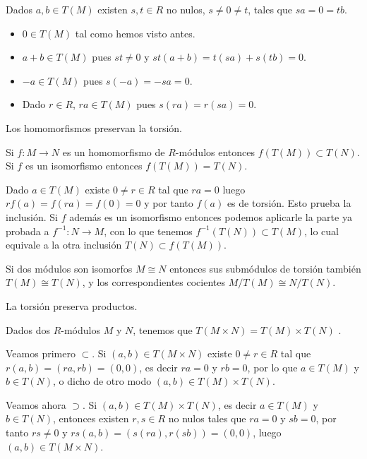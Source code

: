 
Dados \(a,b\in T(M)\) existen \(s,t\in R\) no nulos, \(s\neq 0\neq t\),
tales que \(sa=0=tb\).

\begin{itemize}
\item
  \(0\in T(M)\) tal como hemos visto antes.
\item
  \(a+b\in T(M)\) pues \(st\neq 0\) y \(st(a+b)=t(sa)+s(tb)=0\).
\item
  \(-a\in T(M)\) pues \(s(-a)=-sa=0\).
\item
  Dado \(r\in R\), \(ra\in T(M)\) pues \(s(ra)=r(sa)=0\).
\end{itemize}


Los homomorfismos preservan la torsión.

\label{homotorsion} Si \(f\colon M\rightarrow N\) es
un homomorfismo de \(R\)-módulos entonces \(f(T(M))\subset T(N)\). Si
\(f\) es un isomorfismo entonces \(f(T(M))= T(N)\). 


Dado \(a\in T(M)\) existe \(0\neq r\in R\) tal que \(ra=0\) luego
\(rf(a)=f(ra)=f(0)=0\) y por tanto \(f(a)\) es de torsión. Esto prueba
la inclusión. Si \(f\) además es un isomorfismo entonces podemos
aplicarle la parte ya probada a \(f^{-1}\colon N\rightarrow M\), con lo
que tenemos \(f^{-1}(T(N))\subset T(M)\), lo cual equivale a la otra
inclusión \(T(N)\subset f(T(M))\). 

\label{torsionquotient} Si dos módulos son isomorfos
\(M\cong N\) entonces sus submódulos de torsión también
\(T(M)\cong T(N)\), y los correspondientes cocientes
\(M/T(M)\cong N/T(N)\). 

La torsión preserva productos.

\label{torsionproduct} Dados dos \(R\)-módulos \(M\)
y \(N\), tenemos que \(T(M\times N)=T(M)\times T(N)\) .


Veamos primero \(\subset\). Si \((a,b)\in T(M\times N)\) existe
\(0\neq r\in R\) tal que \(r(a,b)=(ra,rb)=(0,0)\), es decir \(ra=0\) y
\(rb=0\), por lo que \(a\in T(M)\) y \(b\in T(N)\), o dicho de otro modo
\((a,b)\in T(M)\times T(N)\).

Veamos ahora \(\supset\). Si \((a,b)\in T(M)\times T(N)\), es decir
\(a\in T(M)\) y \(b\in T(N)\), entonces existen \(r,s\in R\) no nulos
tales que \(ra=0\) y \(sb=0\), por tanto \(rs\neq 0\) y
\(rs(a,b)=(s(ra),r(sb))=(0,0)\), luego \((a,b)\in T(M\times N)\).


